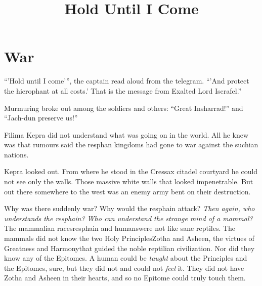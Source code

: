 \documentclass
  [a4paper,
   12pt,
   oneside
  ]%
  {article}
\title{Hold Until I Come}
\begin{document}
    \maketitle
    \tableofcontents














% 



\section{War}
``'Hold until I come'{}'', the captain read aloud from the telegram. ``'And protect the hierophant at all costs.' That is the message from Exalted Lord Iscrafel.'' 

Murmuring broke out among the soldiers and others: ``Great Insharrad!'' and ``Jach-dun preserve us!'' 

Filima Kepra did not understand what was going on in the world. 
All he knew was that rumours said the resphan kingdoms had gone to war against the suchian nations. 

Kepra looked out. From where he stood in the Cressax citadel courtyard he could not see only the walls. Those massive white walls that looked impenetrable. 
But out there somewhere to the west was an enemy army bent on their destruction.

Why was there suddenly war? Why would the resphain attack? 
\emph{Then again, who understands the resphain? Who can understand the strange mind of a mammal?} 
The mammalian races\dash{}resphain and humans\dash{}were not like sane reptiles. The mammals did not know the two Holy Principles\dash{}Zotha and Asheen, the virtues of Greatness and Harmony\dash{}that guided the noble reptilian civilization. Nor did they know any of the Epitomes. A human could be \emph{taught} about the Principles and the Epitomes, sure, but they did not and could not \emph{feel} it. They did not have Zotha and Asheen in their hearts, and so no Epitome could truly touch them. 
\end{document}
